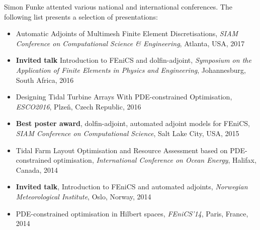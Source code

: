 \documentclass[11pt]{article}
\newenvironment{outerlist}[1][\enskip\textbullet]
        {\begin{itemize}[ #1]}{\end{itemize}}
\begin{document}
Simon Funke attented various national and international conferences. The following list
presents a selection of presentations:
\begin{outerlist}
\item[] Automatic Adjoints of Multimesh Finite Element Discretisations, \textit{SIAM Conference on Computational Science \& Engineering}, Atlanta, USA, 2017
\item[] \textbf{Invited talk} Introduction to FEniCS and dolfin-adjoint, \textit{Symposium on the Application of Finite Elements in Physics and Engineering}, Johannesburg, South Africa, 2016
\item[] Designing Tidal Turbine Arrays With PDE-constrained Optimisation, \textit{ESCO2016}, Plze\v{n}, Czech Republic, 2016
\item[] \textbf{Best poster award}, dolfin-adjoint, automated adjoint models for FEniCS, \textit{SIAM Conference on Computational Science}, Salt Lake City, USA, 2015
\item[] Tidal Farm Layout Optimisation and Resource Assessment based on PDE-constrained optimisation, \textit{International Conference on Ocean Energy}, Halifax, Canada, 2014
\item[] \textbf{Invited talk}, Introduction to FEniCS and automated adjoints, \textit{Norwegian Meteorological Institute}, Oslo, Norway, 2014
\item[] PDE-constrained optimisation in Hilbert spaces, \textit{FEniCS'14}, Paris, France, 2014

\end{outerlist}
\end{document}
